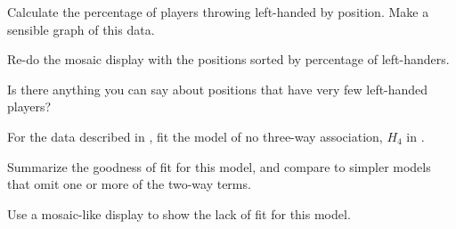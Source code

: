 \documentclass[10pt]{report}\usepackage[]{graphicx}\usepackage[]{color}
\begin{document}
\begin{Exercises}
\begin{enumerate*}
    \item Calculate the percentage of players throwing left-handed by position.
    Make a sensible graph of this data.
    \begin{ans}
    \end{ans}
    
    \item Re-do the mosaic display with the positions sorted by percentage of left-handers.
    \begin{ans}
    \end{ans}
    
    \item Is there anything you can say about positions that have very few left-handed
    players?
    \begin{ans}
    \end{ans}
    
  \end{enumerate*}


\exercise For the  data described in , fit the model of no three-way
association, $H_4$ in . 
  \begin{enumerate*}
  
  \item Summarize the goodness of fit for this model, and compare to simpler models that
  omit one or more of the two-way terms.
  \begin{ans}
  \end{ans}
  
  
  \item Use a mosaic-like display to show the lack of fit for this model.
  \begin{ans}
  \end{ans}
  
  \end{enumerate*}


\end{Exercises}
\end{document}
